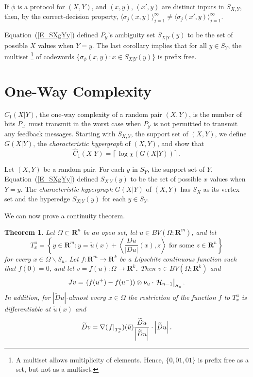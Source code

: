 \documentclass{article}
\newtheorem{thm}{Theorem}[section]
\theoremstyle{definition}
\theoremstyle{remark}
\newcommand{\st}{\sigma}
\newcommand{\XcY}{{(X,Y)}}
\newcommand{\SX}{{S_X}}
\newcommand{\SY}{{S_Y}}
\newcommand{\SXY}{{S_{X,Y}}}
\newcommand{\SXgYy}{{S_{X|Y}(y)}}
\newcommand{\Cw}[1]{{\hat C_#1(X|Y)}}
\newcommand{\GG}{{G(X|Y)}}
\newcommand{\PY}{{P_{\mathcal{Y}}}}
\newcommand{\X}{{\mathcal{X}}}
\newcommand{\wt}{\widetilde}
\newcommand{\eval}[2][\right]{\relax
  \ifx#1\right\relax \left.\fi#2#1\rvert}
\newcommand{\envert}[1]{\left\lvert#1\right\rvert}
\let\abs=\envert
\begin{document}
If $\phi$ is a protocol for $(X,Y)$, and $(x,y)$, $(x',y)$ are distinct
inputs in $\SXY$, then, by the correct-decision property,
$\langle\st_j(x,y)\rangle_{j=1}^\infty\ne\langle
\st_j(x',y)\rangle_{j=1}^\infty$.

Equation~(\ref{E_SXgYy}) defined $\PY$'s ambiguity set $\SXgYy$
to be the set of possible $X$ values when $Y=y$.
The last corollary implies that for all $y\in\SY$,
the multiset%
\footnote{A multiset allows multiplicity of elements.
Hence, $\{0,01,01\}$ is prefix free as a set, but not as a multiset.}
of codewords $\{\st_\phi(x,y):x\in\SXgYy\}$ is prefix free.

\section{One-Way Complexity}
\label{S_Cp1}

$\Cw1$, the one-way complexity of a random pair $\XcY$,
is the number of bits $P_\X$ must transmit in the worst case
when $\PY$ is not permitted to transmit any feedback messages.
Starting with $\SXY$, the support set of $\XcY$, we define $\GG$,
the \textit{characteristic hypergraph} of $\XcY$, and show that
\[
\Cw1=\lceil\,\log\chi(\GG)\rceil\ .
\]

Let $\XcY$ be a random pair. For each $y$ in $\SY$, the support set of
$Y$, Equation~(\ref{E_SXgYy}) defined $\SXgYy$ to be the set of possible
$x$ values when $Y=y$. The \textit{characteristic hypergraph} $\GG$ of
$\XcY$ has $\SX$ as its vertex set and the hyperedge $\SXgYy$ for each
$y\in\SY$.


We can now prove a continuity theorem.
\begin{thm}\label{t:conl}
Let $\Omega \subset\mathbf{R}^n$ be an open set, let
$u\in BV(\Omega ;\mathbf{R}^m)$, and let
\begin{equation}\label{quts}
T^u_x=\left\{y\in\mathbf{R}^m:
 y=\tilde u(x)+\left\langle \frac{Du}{\abs{Du}}(x),z
\right\rangle \text{ for some }z\in\mathbf{R}^n\right\}
\end{equation}
for every $x\in\Omega \backslash S_u$. Let $f\colon \mathbf{R}^m\to
\mathbf{R}^k$ be a Lipschitz continuous function such that $f(0)=0$, and
let $v=f(u)\colon \Omega \to \mathbf{R}^k$. Then $v\in BV(\Omega
;\mathbf{R}^k)$ and
\begin{equation}
Jv=\eval{(f(u^+)-f(u^-))\otimes \nu_u\cdot\,
\mathcal{H}_{n-1}}_{S_u}.
\end{equation}
In addition, for $\abs{\wt{D}u}$-almost every $x\in\Omega $ the
restriction of the function $f$ to $T^u_x$ is differentiable at $\tilde
u(x)$ and
\begin{equation}
\wt{D}v=\nabla (\eval{f}_{T^u_x})(\tilde u)
\frac{\wt{D}u}{\abs{\wt{D}u}}\cdot\abs{\wt{D}u}.\end{equation}
\end{thm}
\end{document}
